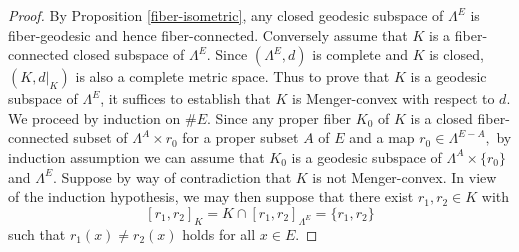 \documentclass[11pt,a4paper]{amsart}
\theoremstyle{definition}
\numberwithin{equation}{section}
\begin{document}
\begin{proof} By Proposition \ref{fiber-isometric}, any closed geodesic subspace of $\Lambda^E$ is fiber-geodesic and hence fiber-connected. Conversely
assume that $K$ is a fiber-connected closed subspace of $\Lambda^E$.  Since $({\Lambda}^E,d)$ is  complete and $K$ is closed, $(K,d|_{K})$ is also
a complete metric space. Thus to prove that $K$ is a geodesic subspace of ${\Lambda}^E$, it suffices
to establish that $K$ is Menger-convex with respect to $d$. We proceed by induction on $\#E.$ Since any proper fiber ${K}_0$ of $K$
is a closed fiber-connected subset of ${\Lambda}^A\times r_0$ for a proper subset $A$ of $E$ and a map $r_0\in \Lambda^{E-A},$
by induction assumption we can assume that ${K}_0$ is a geodesic subspace of ${\Lambda}^A\times \{ r_0\}$ and $\Lambda^E$. Suppose by way
of contradiction that $K$ is not Menger-convex. In view of the induction hypothesis, we may then suppose that
there exist $r_1, r_2 \in {K}$ with
$$[r_1, r_2]_{K}=K \cap [r_1,r_2]_{\Lambda^E}= \{ r_1, r_2\}$$
such that $r_1(x) \neq r_2(x)$ holds for all $x \in E.$


\end{proof}
\end{document}
